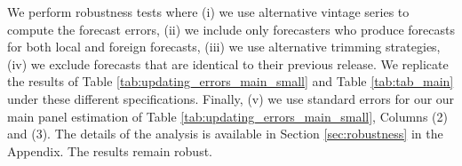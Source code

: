 We perform robustness tests where (i) we use alternative vintage series to compute the forecast errors, (ii) we include only forecasters who produce forecasts for both local and foreign forecasts, (iii) we use alternative trimming strategies, (iv) we exclude forecasts that are identical to their previous release. We replicate the results of Table \ref{tab:updating_errors_main_small} and Table \ref{tab:tab_main} under these different specifications.  Finally, (v) we use \citet{Driscoll1998} standard errors for our our main panel estimation of Table \ref{tab:updating_errors_main_small}, Columns (2) and (3). The details of the analysis is available in Section \ref{sec:robustness} in the Appendix. The results remain robust.

